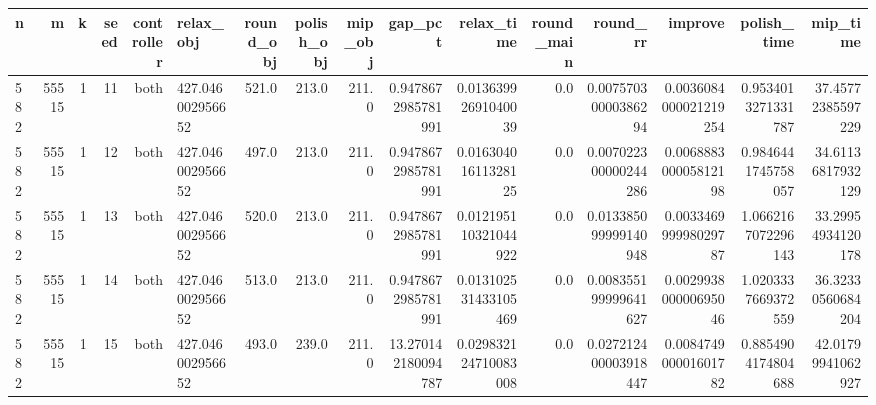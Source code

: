 \begin{tabular}{lrrrrlrrrrrrrrrr}
\hline
n & m & k & seed & controller & relax_obj & round_obj & polish_obj & mip_obj & gap_pct & relax_time & round_main & round_rr & improve & polish_time & mip_time \\ \hline
582 & 55515 & 1 & 11 & both & 427.046002956652 & 521.0 & 213.0 & 211.0 & 0.9478672985781991 & 0.01363992691040039 & 0.0 & 0.00757030000386294 & 0.0036084000021219254 & 0.9534013271331787 & 37.45772385597229 \\
582 & 55515 & 1 & 12 & both & 427.046002956652 & 497.0 & 213.0 & 211.0 & 0.9478672985781991 & 0.01630401611328125 & 0.0 & 0.007022300000244286 & 0.006888300005812198 & 0.9846441745758057 & 34.61136817932129 \\
582 & 55515 & 1 & 13 & both & 427.046002956652 & 520.0 & 213.0 & 211.0 & 0.9478672985781991 & 0.012195110321044922 & 0.0 & 0.013385099999140948 & 0.003346999998029787 & 1.0662167072296143 & 33.29954934120178 \\
582 & 55515 & 1 & 14 & both & 427.046002956652 & 513.0 & 213.0 & 211.0 & 0.9478672985781991 & 0.013102531433105469 & 0.0 & 0.008355199999641627 & 0.002993800000695046 & 1.0203337669372559 & 36.32330560684204 \\
582 & 55515 & 1 & 15 & both & 427.046002956652 & 493.0 & 239.0 & 211.0 & 13.270142180094787 & 0.029832124710083008 & 0.0 & 0.027212400003918447 & 0.008474900001601782 & 0.8854904174804688 & 42.01799941062927 \\
\hline
\end{tabular}
